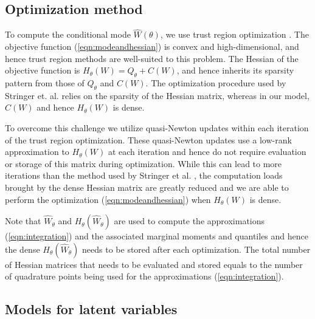 \documentclass[num-refs,serif,10pt]{wiley-article}
\begin{document}
\subsection{Optimization method}\label{subsec:opt}

To compute the conditional mode $\hat{W}(\theta)$, we use trust region optimization \cite{trustoptim}. The objective function (\ref{eqn:modeandhessian}) is convex and high-dimensional, and hence trust region methods are well-suited to this problem. The Hessian of the objective function is $H_{\theta}(W) = Q_{\theta} + C(W)$, and hence inherits its sparsity pattern from those of $Q_{\theta}$ and $C(W)$. The optimization procedure used by Stringer et. al. \cite{casecross} relies on the sparsity of the Hessian matrix, whereas in our model, $C(W)$ and hence $H_{\theta}(W)$ is dense. 

To overcome this challenge we utilize quasi-Newton updates within each iteration of the trust region optimization. These quasi-Newton updates use a low-rank approximation to $H_{\theta}(W)$ at each iteration and hence do not require evaluation or storage of this matrix during optimization. While this can lead to more iterations than the method used by Stringer et al. \cite{casecross}, the computation loads brought by the dense Hessian matrix are greatly reduced and we are able to perform the optimization (\ref{eqn:modeandhessian}) when $H_{\theta}(W)$ is dense. 

Note that $\widehat{W}_{\theta}$ and $H_{\theta}(\widehat{W}_{\theta})$ are used to compute the approximations (\ref{eqn:integration}) and the associated marginal moments and quantiles and hence the dense $H_{\theta}(\widehat{W}_{\theta})$ needs to be stored after each optimization. The total number of Hessian matrices that needs to be evaluated and stored equals to the number of quadrature points being used for the approximations (\ref{eqn:integration}).


\subsection{Models for latent variables}\label{subsec:latent}
\end{document}
